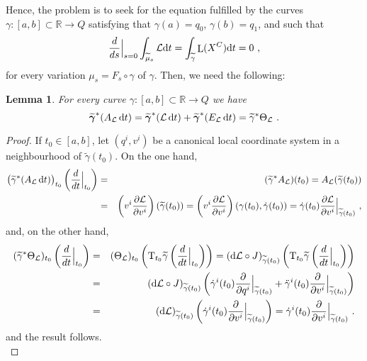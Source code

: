 \documentclass[12pt]{report}
\newtheorem{lem}[teor]{Lemma}
\def\derpar#1#2{\frac{\partial{#1}}{\partial{#2}}}
\def\qed{\ifvmode\removelastskip\fi
{\unskip\nobreak\hfil\penalty50\hbox{}\nobreak\hfil
\hbox{\vrule height1.2ex width1.2ex}\parfillskip=0pt
\finalhyphendemerits=0 \par\smallskip}}
\def\Lag{{\cal L}}
\def\d{{\rm d}}
\def\Real{\mathbb{R}}
\def\Tan{{\rm T}}
\def\Lie{\mathop{\rm L}\nolimits}
\begin{document}
Hence, the problem is to seek for the equation fulfilled by the curves 
$\gamma \colon [a,b]\subset\Real \to Q$
satisfying that $\gamma (a)=q_0$, $\gamma (b)=q_1$,
and such that
$$
\frac{d}{d s}\Big\vert_{s=0}\int_{\widetilde  \mu_s}\Lag \d t=
\int_{\widetilde  \gamma}\Lie (X^C)\d t = 0 \ ,
$$
for every variation $\mu_s=F_s\circ\gamma$ of $\gamma$.
Then, we need the following:

\begin{lem}
For every curve $\gamma \colon [a,b]\subset\Real \to Q$ we have
$$
\widetilde{\mbox{\boldmath$\gamma$}}^*(A_\Lag\,\d t)= 
\widetilde{\mbox{\boldmath$\gamma$}}^*(\Lag\,\d t) + \widetilde{\mbox{\boldmath$\gamma$}}^*(E_\Lag\,\d t)=
\widetilde{\gamma}^*\Theta_\Lag
\ .
$$
\end{lem}
\begin{proof}
If $t_0\in [a,b]$, let $(q^i,v^i)$ be
a canonical local coordinate system in a neighbourhood of
$\widetilde{\gamma} (t_0)$. 
On the one hand,
\begin{eqnarray*}
 \big(\widetilde{\gamma}^*(A_\Lag\,\d t)\big)_{t_0}\left(\frac{d}{d t}\Big\vert_{t_0}\right)
 &=&(\widetilde{\gamma}^*A_\Lag)(t_0)
=A_\Lag(\widetilde  \gamma (t_0))
\\ &=&
\left(v^i\derpar{\Lag}{v^i}\right)(\widetilde  \gamma (t_0)) =
\left(v^i\derpar{\Lag}{v^i}\right)(\gamma (t_0),\dot\gamma (t_0))=
\dot\gamma (t_0)\derpar{\Lag}{v^i}\Big\vert_{\widetilde  \gamma (t_0)} \ ,
\end{eqnarray*}
and, on the other hand,
\begin{eqnarray*}
(\widetilde{\gamma}^*\Theta_\Lag)_{t_0}\left(\frac{d}{d t}\Big\vert_{t_0}\right)
&=&
(\Theta_\Lag)_{t_0}\left(\Tan_{t_0}\widetilde\gamma\left(\frac{d}{d t}\Big\vert_{t_0}\right)\right)=
(\d\Lag\circ J)_{\widetilde\gamma (t_0)}
\left(\Tan_{t_0}\widetilde{\gamma}\left(\frac{d}{d t}\Big\vert_{t_0}\right)\right)
\\ &=&
(\d\Lag\circ J)_{\widetilde\gamma (t_0)}
\left(\dot\gamma^i(t_0)\derpar{}{q^i}\Big\vert_{\widetilde  \gamma (t_0)}
+\ddot\gamma^i(t_0)\derpar{}{v^i}\Big\vert_{\widetilde  \gamma (t_0)}\right)
\\ &=&
(\d\Lag)_{\widetilde\gamma (t_0)}
\left(\dot\gamma^i(t_0)\derpar{}{v^i}\Big\vert_{\widetilde\gamma (t_0)}\right)
=\dot\gamma^i(t_0)\derpar{}{v^i}\Big\vert_{\widetilde\gamma (t_0)} \ .
\end{eqnarray*}
and the result follows.
\\ \qed \end{proof}
\end{document}
